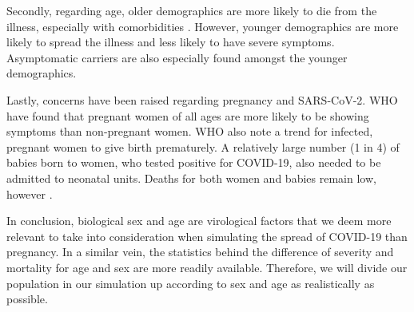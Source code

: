 Secondly, regarding age, older demographics are more likely to die from the illness, especially with comorbidities \citep{jin_gender_2020}. However, younger demographics are more likely to spread the illness \citep{ssi_statens_nodate} and less likely to have severe symptoms. Asymptomatic carriers are also especially found amongst the younger demographics.

Lastly, concerns have been raised regarding pregnancy and SARS-CoV-2. WHO have found that pregnant women of all ages are more likely to be showing symptoms than non-pregnant women. WHO also note a trend for infected, pregnant women to give birth prematurely. A relatively large number (1 in 4) of babies born to women, who tested positive for COVID-19, also needed to be admitted to neonatal units. Deaths for both women and babies remain low, however \citep{who_new_nodate}. 

In conclusion, biological sex and age are virological factors that we deem more relevant to take into consideration when simulating the spread of COVID-19 than pregnancy. In a similar vein, the statistics behind the difference of severity and mortality for age and sex are more readily available. Therefore, we will divide our population in our simulation up according to sex and age as realistically as possible.